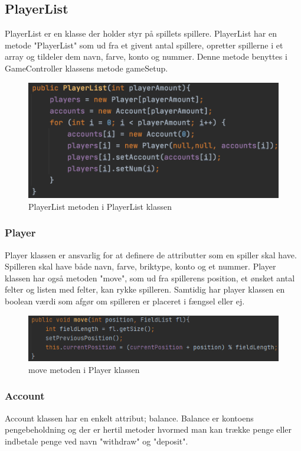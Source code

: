 \subsection{PlayerList}
PlayerList er en klasse der holder styr på spillets spillere. PlayerList har en metode "PlayerList" som ud fra et givent antal spillere, opretter spillerne i et array og tildeler dem navn, farve, konto og nummer. Denne metode benyttes i GameController klassens metode gameSetup.
\begin{figure}[H]
    \centering
    \includegraphics[width=\textwidth]{sources/7_implementering/PlayerList PlayerList.png}
    \caption{PlayerList metoden i PlayerList klassen}
    \label{fig:readFile}
\end{figure}



\subsubsection{Player}
Player klassen er ansvarlig for at definere de attributter som en spiller skal have. Spilleren skal have både navn, farve, briktype, konto og et nummer. Player klassen har også metoden "move", som ud fra spillerens position, et ønsket antal felter og listen med felter, kan rykke spilleren. Samtidig har player klassen en boolean værdi som afgør om spilleren er placeret i fængsel eller ej.
\begin{figure}[H]
    \centering
    \includegraphics[width=\textwidth]{sources/7_implementering/move-method.png}
    \caption{move metoden i Player klassen}
    \label{fig:readFile}
\end{figure}

\subsubsection{Account}
Account klassen har en enkelt attribut; balance. Balance er kontoens pengebeholdning og der er hertil metoder hvormed man kan trække penge eller indbetale penge ved navn "withdraw" og "deposit".